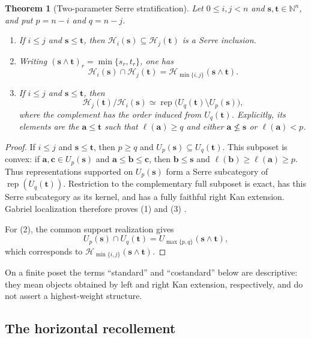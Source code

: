 \documentclass[10pt,a4paper]{amsart}
\newtheorem{theorem}{Theorem}[section]
\newcommand{\Rep}{\operatorname{rep}}
\begin{document}
\begin{theorem}[Two-parameter Serre stratification]\label{thm:two-parameter}
Let $0\le i,j<n$ and $\mathbf s,\mathbf t\in\mathbb N^n$, and put
$p=n-i$ and $q=n-j$.
\begin{enumerate}[label=\rm(\arabic*)]
\item If $i\le j$ and $\mathbf s\le\mathbf t$, then
$\mathcal H_i(\mathbf s)\subseteq\mathcal H_j(\mathbf t)$ is a Serre
inclusion.
\item Writing
$(\mathbf s\wedge\mathbf t)_r=\min\{s_r,t_r\}$, one has
\[
\mathcal H_i(\mathbf s)\cap\mathcal H_j(\mathbf t)
=\mathcal H_{\min\{i,j\}}(\mathbf s\wedge\mathbf t).
\]
\item If $i\le j$ and $\mathbf s\le\mathbf t$, then
\[
\mathcal H_j(\mathbf t)/\mathcal H_i(\mathbf s)
\simeq
\Rep\bigl(U_q(\mathbf t)\setminus U_p(\mathbf s)\bigr),
\]
where the complement has the order induced from $U_q(\mathbf t)$.
Explicitly, its elements are the $\mathbf a\le\mathbf t$ such that
$\ell(\mathbf a)\ge q$ and either $\mathbf a\nleq\mathbf s$ or
$\ell(\mathbf a)<p$.
\end{enumerate}
\end{theorem}

\begin{proof}
If $i\le j$ and $\mathbf s\le\mathbf t$, then $p\ge q$ and
$U_p(\mathbf s)\subseteq U_q(\mathbf t)$.  This subposet is convex: if
$\mathbf a,\mathbf c\in U_p(\mathbf s)$ and
$\mathbf a\le\mathbf b\le\mathbf c$, then
$\mathbf b\le\mathbf s$ and $\ell(\mathbf b)\ge\ell(\mathbf a)\ge p$.
Thus representations supported on $U_p(\mathbf s)$ form a Serre subcategory
of $\Rep(U_q(\mathbf t))$.  Restriction to the complementary full subposet is
exact, has this Serre subcategory as its kernel, and has a fully faithful
right Kan extension.  Gabriel localization therefore proves (1) and (3)
\cite{Gabriel}.

For (2), the common support realization gives
\[
U_p(\mathbf s)\cap U_q(\mathbf t)
=U_{\max\{p,q\}}(\mathbf s\wedge\mathbf t),
\]
which corresponds to
$\mathcal H_{\min\{i,j\}}(\mathbf s\wedge\mathbf t)$.
\end{proof}

On a finite poset the terms ``standard'' and ``costandard'' below are
descriptive: they mean objects obtained by left and right Kan extension,
respectively, and do not assert a highest-weight structure.

\subsection{The horizontal recollement}\label{subsec:horizontal-recollement}
\end{document}
